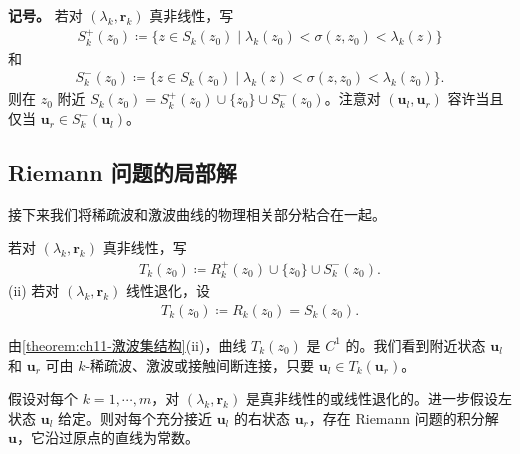 \documentclass[../../main.tex]{subfiles}
\begin{document}
\textbf{记号。} 若对 $(\lambda_k,\mathbf{r}_k)$ 真非线性，写
\begin{align*}
S_k^+(z_0)\coloneqq\{z\in S_k(z_0)\mid\lambda_k(z_0)<\sigma(z,z_0)<\lambda_k(z)\}
\end{align*}
和
\begin{align*}
S_k^-(z_0)\coloneqq\{z\in S_k(z_0)\mid\lambda_k(z)<\sigma(z,z_0)<\lambda_k(z_0)\}.
\end{align*}
则在 $z_0$ 附近 $S_k(z_0)=S_k^+(z_0)\cup\{z_0\}\cup S_k^-(z_0)$。注意对 $(\mathbf{u}_l,\mathbf{u}_r)$ 容许当且仅当 $\mathbf{u}_r\in S_k^-(\mathbf{u}_l)$。

\subsection{Riemann 问题的局部解}\label{subsection:ch11-Riemann局部解}

接下来我们将稀疏波和激波曲线的物理相关部分粘合在一起。

\begin{definition}[i]\label{definition:ch11-T曲线} 若对 $(\lambda_k,\mathbf{r}_k)$ 真非线性，写
\begin{align*}
T_k(z_0)\coloneqq R_k^+(z_0)\cup\{z_0\}\cup S_k^-(z_0).
\end{align*}
(ii) 若对 $(\lambda_k,\mathbf{r}_k)$ 线性退化，设
\begin{align*}
T_k(z_0)\coloneqq R_k(z_0)=S_k(z_0).
\end{align*}
\end{definition}

由\cref{theorem:ch11-激波集结构}(ii)，曲线 $T_k(z_0)$ 是 $C^1$ 的。我们看到附近状态 $\mathbf{u}_l$ 和 $\mathbf{u}_r$ 可由 $k$-稀疏波、激波或接触间断连接，只要 $\mathbf{u}_l\in T_k(\mathbf{u}_r)$。

\begin{theorem}\label{theorem:ch11-Riemann局部解}假设对每个 $k=1,\cdots,m$，对 $(\lambda_k,\mathbf{r}_k)$ 是真非线性的或线性退化的。进一步假设左状态 $\mathbf{u}_l$ 给定。则对每个充分接近 $\mathbf{u}_l$ 的右状态 $\mathbf{u}_r$，存在 Riemann 问题的积分解 $\mathbf{u}$，它沿过原点的直线为常数。
\end{theorem}
\end{document}

